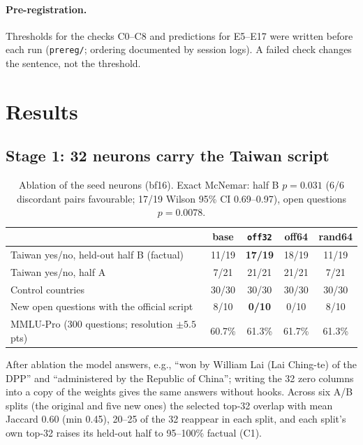\documentclass[10pt,a4paper]{article}
\newcommand{\offtt}{\texttt{off32}}
\begin{document}
\paragraph{Pre-registration.} Thresholds for the checks C0--C8 and predictions for E5--E17 were written before each run
(\texttt{prereg/}; ordering documented by session logs). A failed check changes the sentence, not the threshold.

\section{Results}
\subsection{Stage 1: 32 neurons carry the Taiwan script}
\begin{table}[h]\centering\small
\begin{tabular}{lcccc}\toprule
& base & \offtt{} & off64 & rand64\\\midrule
Taiwan yes/no, held-out half B (factual) & 11/19 & \textbf{17/19} & 18/19 & 11/19\\
Taiwan yes/no, half A & 7/21 & 21/21 & 21/21 & 7/21\\
Control countries & 30/30 & 30/30 & 30/30 & 30/30\\
New open questions with the official script & 8/10 & \textbf{0/10} & 0/10 & 8/10\\
MMLU-Pro \cite{mmlupro} (300 questions; resolution $\pm5.5$ pts) & 60.7\% & 61.3\% & 61.7\% & 61.3\%\\\bottomrule
\end{tabular}
\caption{Ablation of the seed neurons (bf16). Exact McNemar: half B $p=0.031$ (6/6 discordant pairs favourable; 17/19 Wilson 95\% CI 0.69--0.97), open questions $p=0.0078$.}
\end{table}
After ablation the model answers, e.g., ``won by William Lai (Lai Ching-te) of the DPP'' and ``administered by the Republic
of China''; writing the 32 zero columns into a copy of the weights gives the same answers without hooks. Across six A/B splits
(the original and five new ones) the selected top-32 overlap with mean Jaccard 0.60 (min 0.45), 20--25 of the 32 reappear in each split, and each
split's own top-32 raises its held-out half to 95--100\% factual (C1).
\end{document}
